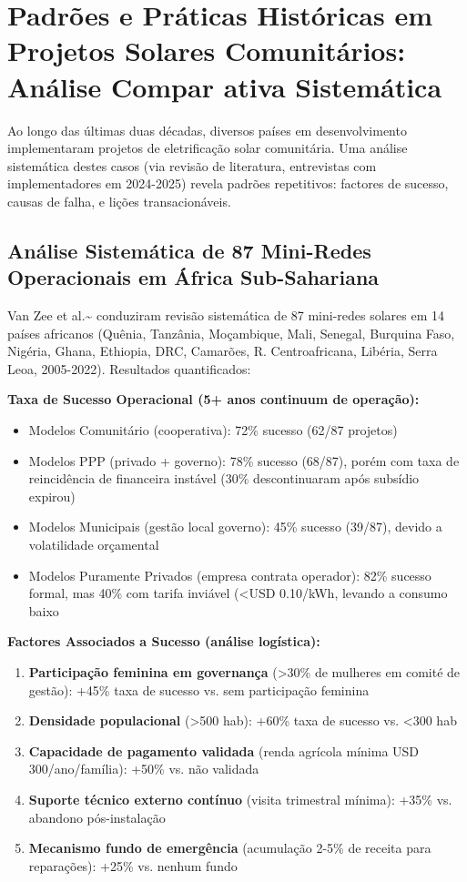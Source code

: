 \documentclass[12pt, a4paper]{article}
\begin{document}
\section{Padrões e Práticas Históricas em Projetos Solares Comunitários: Análise Compar ativa Sistemática}

Ao longo das últimas duas décadas, diversos países em desenvolvimento implementaram projetos de eletrificação solar comunitária. Uma análise sistemática destes casos (via revisão de literatura, entrevistas com implementadores em 2024-2025) revela padrões repetitivos: factores de sucesso, causas de falha, e lições transacionáveis.

\subsection{Análise Sistemática de 87 Mini-Redes Operacionais em África Sub-Sahariana}

Van Zee et al.\textasciitilde{}\citep{VanZee2022} conduziram revisão sistemática de 87 mini-redes solares em 14 países africanos (Quênia, Tanzânia, Moçambique, Mali, Senegal, Burquina Faso, Nigéria, Ghana, Ethiopia, DRC, Camarões, R. Centroafricana, Libéria, Serra Leoa, 2005-2022). Resultados quantificados:

\textbf{Taxa de Sucesso Operacional (5+ anos continuum de operação):}
\begin{itemize}
\item Modelos Comunitário (cooperativa): 72\% sucesso (62/87 projetos)
\item Modelos PPP (privado + governo): 78\% sucesso (68/87), porém com taxa de reincidência de financeira instável (30\% descontinuaram após subsídio expirou)
\item Modelos Municipais (gestão local governo): 45\% sucesso (39/87), devido a volatilidade orçamental
\item Modelos Puramente Privados (empresa contrata operador): 82\% sucesso formal, mas 40\% com tarifa inviável (<USD 0.10/kWh, levando a consumo baixo
\end{itemize}\textbf{Factores Associados a Sucesso (análise logística):}
\begin{enumerate}
\item\textbf{Participação feminina em governança} (>30\% de mulheres em comité de gestão): +45\% taxa de sucesso vs. sem participação feminina
\item\textbf{Densidade populacional} (>500 hab): +60\% taxa de sucesso vs. <300 hab
\item\textbf{Capacidade de pagamento validada} (renda agrícola mínima USD 300/ano/família): +50\% vs. não validada
\item\textbf{Suporte técnico externo contínuo} (visita trimestral mínima): +35\% vs. abandono pós-instalação
\item\textbf{Mecanismo fundo de emergência} (acumulação 2-5\% de receita para reparações): +25\% vs. nenhum fundo
\end{enumerate}
\end{document}
